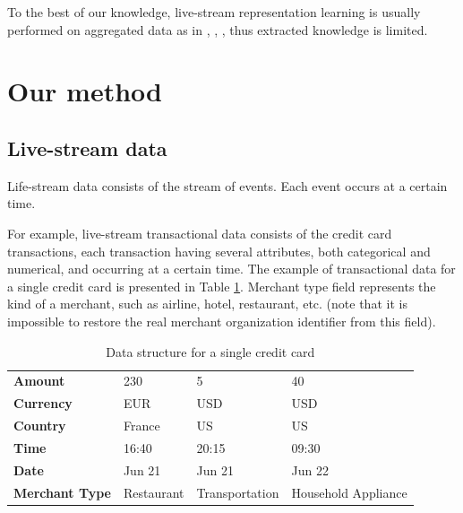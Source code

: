 \documentclass[sigconf]{acmart}
\begin{document}
To the best of our knowledge, live-stream representation learning is usually performed on aggregated data as in \cite{baldassini2018client2vec}, \cite{mancisidor2019learning}, \cite{doan2019generating}, thus extracted knowledge is limited.  










\section{Our method} \label{sec-method}

\subsection{Live-stream data}

Life-stream data consists of the stream of events. Each event occurs at a certain time.

For example, live-stream transactional data consists of the credit card transactions, each transaction having several attributes, both categorical and numerical, and occurring at a certain time. The example of transactional data for a single credit card is presented in Table \ref{tab-tr-data}.
Merchant type field represents the kind of a merchant, such as airline, hotel, restaurant, etc. (note that it is impossible to restore the real merchant organization identifier from this field).

\begin{table}[ht]
\caption{Data structure for a single credit card}
\begin{tabular}{ | m{7em} |  m{5em} m{5em} m{5em}| }
\hline
\textbf{Amount} & 230 & 5 & 40 \\
\textbf{Currency} & EUR & USD & USD \\
\textbf{Country} & France & US & US \\
\textbf{Time} & 16:40 & 20:15 & 09:30 \\
\textbf{Date} & Jun 21 & Jun 21 & Jun 22 \\
\textbf{Merchant Type} & Restaurant & Transport\-ation & Household Appliance \\
\hline
\end{tabular}
\label{tab-tr-data}
\end{table}
\end{document}
